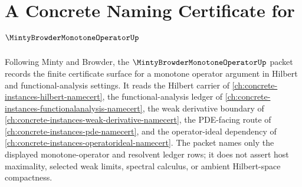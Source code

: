 \chapter{A Concrete Naming Certificate for $\MintyBrowderMonotoneOperatorUp$}
\label{ch:concrete-instances-minty-browder-monotone-operator-namecert}

Following Minty and Browder, the $\MintyBrowderMonotoneOperatorUp$ packet records the finite certificate surface for a monotone operator argument in Hilbert and functional-analysis settings. It reads the Hilbert carrier of \autoref{ch:concrete-instances-hilbert-namecert}, the functional-analysis ledger of \autoref{ch:concrete-instances-functionalanalysis-namecert}, the weak derivative boundary of \autoref{ch:concrete-instances-weak-derivative-namecert}, the PDE-facing route of \autoref{ch:concrete-instances-pde-namecert}, and the operator-ideal dependency of \autoref{ch:concrete-instances-operatorideal-namecert}. The packet names only the displayed monotone-operator and resolvent ledger rows; it does not assert host maximality, selected weak limits, spectral calculus, or ambient Hilbert-space compactness.

